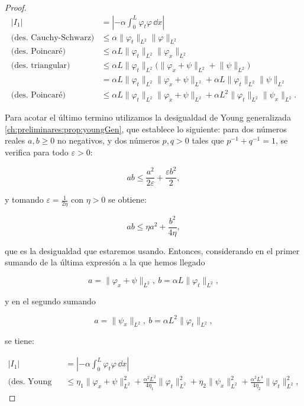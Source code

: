\begin{proof}
    \begin{align*}
        \lvert I_1 \rvert &= \left\lvert-\alpha\int_0^L\varphi_t\varphi \, \dd x\right\lvert\\
        \text{(des. Cauchy-Schwarz)}&\leq \alpha\lVert\varphi_t\rVert_{L^2}\lVert\varphi\rVert_{L^2}\\
        \text{(des. Poincaré)}&\leq \alpha L\lVert\varphi_t\rVert_{L^2}\lVert\varphi_x\rVert_{L^2}\\
        \text{(des. triangular)}&\leq \alpha L \lVert\varphi_t\rVert_{L^2}\big(\lVert \varphi_x + \psi\rVert_{L^2}  + \lVert \psi \rVert_{L^2}\big)\\
        &=\alpha L\lVert\varphi_t\rVert_{L^2}\lVert \varphi_x + \psi\rVert_{L^2} + \alpha L \lVert\varphi_t\rVert_{L^2}\lVert \psi \rVert_{L^2}\\
        \text{(des. Poincaré)}&\leq \alpha L\lVert\varphi_t\rVert_{L^2}\lVert \varphi_x + \psi\rVert_{L^2} + \alpha L^2\lVert\varphi_t\rVert_{L^2}\lVert \psi_x \rVert_{L^2}.
    \end{align*}

    Para acotar el último termino utilizamos la desigualdad de Young generalizada \ref{ch:preliminares:prop:youngGen}, que establece lo siguiente: para dos números reales $a,b \geq 0$ no negativos, y dos números $p,q > 0$ tales que $p^{-1} + q^{-1} = 1$, se verifica para todo $\varepsilon > 0$:

    \[ab \leq \frac{a^2}{2\varepsilon} + \frac{\varepsilon b^2}{2},\]

    y tomando $\varepsilon = \frac{1}{2\eta}$ con $\eta > 0$ se obtiene:

    \[ab \leq \eta a^2 + \frac{b^2}{4\eta},\]

    que es la desigualdad que estaremos usando. Entonces, considerando en el primer sumando de la última expresión a la que hemos llegado

    \[a = \lVert \varphi_x + \psi\rVert_{L^2} ,\ b = \alpha L\lVert\varphi_t\rVert_{L^2},\]

    y en el segundo sumando

    \[a = \lVert \psi_x \rVert_{L^2}, \ b= \alpha L^2\lVert\varphi_t\rVert_{L^2},\]

    se tiene:

    \begin{align*}
        \lvert I_1 \rvert &= \left\lvert-\alpha\int_0^L\varphi_t\varphi \, \dd x\right\lvert\\
        \text{(des. Young generalizada)}&\leq \eta_1\lVert \varphi_x + \psi\rVert^2_{L^2} + \frac{\alpha^2 L^2}{4\eta_1}\lVert\varphi_t\rVert^2_{L^2}  + \eta_2\lVert \psi_x \rVert^2_{L^2} + \frac{\alpha^2 L^4}{4\eta_2}\lVert\varphi_t\rVert^2_{L^2},
    \end{align*}


\end{proof}
